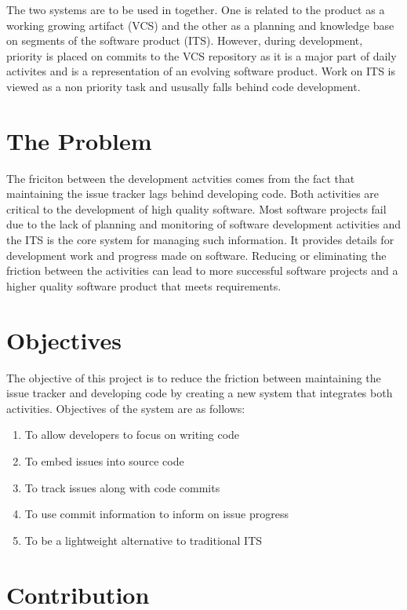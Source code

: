 \documentclass{mproj}
\begin{document}
The two systems are to be used in together. One is related to the product as a working growing artifact (VCS) and the other as a planning and knowledge base on segments of the software product (ITS). However, during development, priority is placed on commits to the VCS repository as it is a major part of daily activites and is a representation of an evolving software product. Work on ITS is viewed as a non priority task and ususally falls behind code development.



\section{The Problem}

The friciton between the development actvities comes from the fact that maintaining the issue tracker lags behind developing code. Both activities are critical to the development of high quality software. Most software projects fail due to the lack of planning and monitoring of software development activities and the ITS is the core system for managing such information. It provides details for development work and progress made on software. Reducing or eliminating the friction between the activities can lead to more successful software projects and a higher quality software product that meets requirements.



\section{Objectives}

The objective of this project is to reduce the friction between maintaining the issue tracker and developing code by creating a new system that integrates both activities. Objectives of the system are as follows:

\begin{enumerate}
  \item To allow developers to focus on writing code
  \item To embed issues into source code
  \item To track issues along with code commits
  \item To use commit information to inform on issue progress
  \item To be a lightweight alternative to traditional ITS
\end{enumerate}


\section{Contribution}
\end{document}
